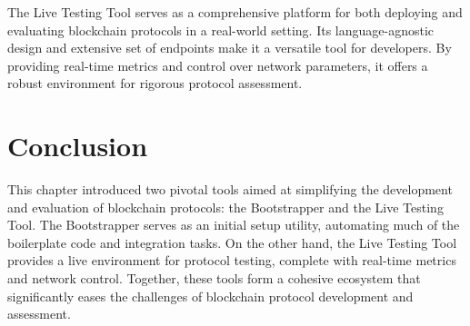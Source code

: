 The Live Testing Tool serves as a comprehensive platform for both deploying and evaluating blockchain protocols in a real-world setting. Its language-agnostic design and extensive set of endpoints make it a versatile tool for developers. By providing real-time metrics and control over network parameters, it offers a robust environment for rigorous protocol assessment.



\section{Conclusion}
This chapter introduced two pivotal tools aimed at simplifying the development and evaluation of blockchain protocols: the Bootstrapper and the Live Testing Tool. The Bootstrapper serves as an initial setup utility, automating much of the boilerplate code and integration tasks. On the other hand, the Live Testing Tool provides a live environment for protocol testing, complete with real-time metrics and network control. Together, these tools form a cohesive ecosystem that significantly eases the challenges of blockchain protocol development and assessment.
